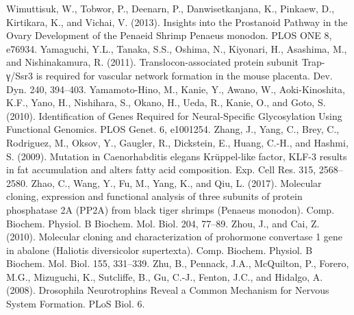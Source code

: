 Wimuttisuk, W., Tobwor, P., Deenarn, P., Danwisetkanjana, K., Pinkaew, D., Kirtikara, K., and Vichai, V. (2013). Insights into the Prostanoid Pathway in the Ovary Development of the Penaeid Shrimp Penaeus monodon. PLOS ONE 8, e76934.
Yamaguchi, Y.L., Tanaka, S.S., Oshima, N., Kiyonari, H., Asashima, M., and Nishinakamura, R. (2011). Translocon-associated protein subunit Trap-γ/Ssr3 is required for vascular network formation in the mouse placenta. Dev. Dyn. 240, 394–403.
Yamamoto-Hino, M., Kanie, Y., Awano, W., Aoki-Kinoshita, K.F., Yano, H., Nishihara, S., Okano, H., Ueda, R., Kanie, O., and Goto, S. (2010). Identification of Genes Required for Neural-Specific Glycosylation Using Functional Genomics. PLOS Genet. 6, e1001254.
Zhang, J., Yang, C., Brey, C., Rodriguez, M., Oksov, Y., Gaugler, R., Dickstein, E., Huang, C.-H., and Hashmi, S. (2009). Mutation in Caenorhabditis elegans Krüppel-like factor, KLF-3 results in fat accumulation and alters fatty acid composition. Exp. Cell Res. 315, 2568–2580.
Zhao, C., Wang, Y., Fu, M., Yang, K., and Qiu, L. (2017). Molecular cloning, expression and functional analysis of three subunits of protein phosphatase 2A (PP2A) from black tiger shrimps (Penaeus monodon). Comp. Biochem. Physiol. B Biochem. Mol. Biol. 204, 77–89.
Zhou, J., and Cai, Z. (2010). Molecular cloning and characterization of prohormone convertase 1 gene in abalone (Haliotis diversicolor supertexta). Comp. Biochem. Physiol. B Biochem. Mol. Biol. 155, 331–339.
Zhu, B., Pennack, J.A., McQuilton, P., Forero, M.G., Mizuguchi, K., Sutcliffe, B., Gu, C.-J., Fenton, J.C., and Hidalgo, A. (2008). Drosophila Neurotrophins Reveal a Common Mechanism for Nervous System Formation. PLoS Biol. 6.


